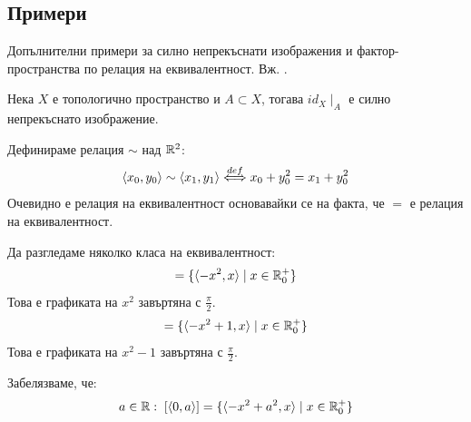 \subsection{Примери}
Допълнителни примери за силно непрекъснати изображения и фактор-пространства по релация на еквивалентност. Вж. \cite[стр.~144-145]{munkrestopology}.
\begin{example}
    Нека $X$ е топологично пространство и $A \subset X$, тогава $id_X\mid_A$ е силно непрекъснато изображение.
\end{example}
\begin{example}
    Дефинираме релация $\sim$ над ${\mathbb{R}}^2$:
    \begin{equation}
        \langle x_0, y_0 \rangle \sim \langle x_1, y_1 \rangle {\overset{def}{\iff}} x_0 + y_0^2 = x_1 + y_0 ^2
    \end{equation}
    Очевидно е релация на еквивалентност основавайки се на факта, че $=$ е релация на еквивалентност.

    Да разгледаме няколко класа на еквивалентност:
    \begin{equation}
        [\langle 0, 0 \rangle] = \{ \langle -x^2, x \rangle \mid x \in \R_0^+\}
    \end{equation}
    Това е графиката на $x^2$ завъртяна с $\frac{\pi}{2}$.
    \begin{equation}
        [\langle 0, 1 \rangle] = \{ \langle -x^2 + 1, x \rangle \mid x \in \R_0^+\}
    \end{equation}
    Това е графиката на $x^2 - 1$ завъртяна с $\frac{\pi}{2}$.

    Забелязваме, че:
    \begin{equation}
        a\in {\mathbb{R}}:\; [\langle 0, a \rangle] = \{ \langle -x^2 + a^2, x \rangle \mid x \in {\mathbb{R}}_0^+\}
    \end{equation}


\end{example}
